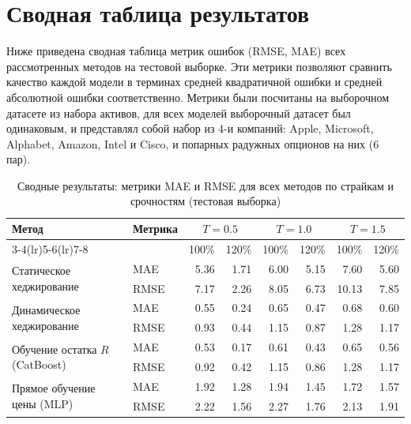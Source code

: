 \section{Сводная таблица результатов}
\label{sec:res-summary}

Ниже приведена сводная таблица метрик ошибок (RMSE, MAE) всех рассмотренных методов на тестовой выборке. 
Эти метрики позволяют сравнить качество каждой модели в терминах средней квадратичной ошибки и средней
 абсолютной ошибки соответственно. Метрики были посчитаны на выборочном датасете из набора активов, для всех моделей выборочный датасет был одинаковым, и
 представлял собой набор из 4-и компаний: Apple, Microsoft, Alphabet, Amazon, Intel и Cisco, и попарных 
 радужных опционов на них (6 пар).

 \begin{table}[H]
\centering
\caption{Сводные результаты: метрики MAE и RMSE для всех методов по страйкам и срочностям (тестовая выборка)}
\label{tab:metrics_summary}
\small
\setlength{\tabcolsep}{4pt}
\begin{tabular}{llrrrrrr}
\toprule
\multirow{2}{*}{Метод} & \multirow{2}{*}{Метрика}
  & \multicolumn{2}{c}{$T=0.5$}
  & \multicolumn{2}{c}{$T=1.0$}
  & \multicolumn{2}{c}{$T=1.5$} \\
\cmidrule(lr){3-4}\cmidrule(lr){5-6}\cmidrule(lr){7-8}
 &  & 100\% & 120\% & 100\% & 120\% & 100\% & 120\% \\
\midrule
\multirow{2}{*}{Статическое хеджирование}
  & MAE  & 5.36 & 1.71 & 6.00 & 5.15 & 7.60 & 5.60 \\
  & RMSE & 7.17 & 2.26 & 8.05 & 6.73 & 10.13 & 7.85 \\
\midrule
\multirow{2}{*}{Динамическое хеджирование}
  & MAE  & 0.55 & 0.24 & 0.65 & 0.47 & 0.68 & 0.60 \\
  & RMSE & 0.93 & 0.44 & 1.15 & 0.87 & 1.28 & 1.17 \\
\midrule
\multirow{2}{*}{Обучение остатка $R$ (CatBoost)}
  & MAE  & 0.53 & 0.17 & 0.61 & 0.43 & 0.65 & 0.56 \\
  & RMSE & 0.92 & 0.42 & 1.15 & 0.86 & 1.28 & 1.17 \\
\midrule
\multirow{2}{*}{Прямое обучение цены (MLP)}
  & MAE  & 1.92 & 1.28 & 1.94 & 1.45 & 1.72 & 1.57 \\
  & RMSE & 2.22 & 1.56 & 2.27 & 1.76 & 2.13 & 1.91 \\
\bottomrule
\end{tabular}
\end{table}

